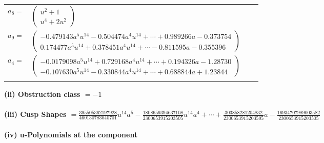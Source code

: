 \documentclass[1p]{elsarticle_modified}
\theoremstyle{definition}
\begin{document}
\begin{tabular}{m{7pt} m{180pt} m{7pt} m{180pt} }
\flushright $a_{8}=$&$\begin{pmatrix}u^2+1\\u^4+2 u^2\end{pmatrix}$ \\
\flushright $a_{9}=$&$\begin{pmatrix}-0.479143 a^{5} u^{14}-0.504474 a^{4} u^{14}+\cdots+0.989266 a-0.373754\\0.174477 a^{5} u^{14}+0.378451 a^{4} u^{14}+\cdots-0.811595 a-0.355396\end{pmatrix}$ \\
\flushright $a_{4}=$&$\begin{pmatrix}-0.0179098 a^{5} u^{14}+0.729168 a^{4} u^{14}+\cdots+0.194326 a-1.28730\\-0.107630 a^{5} u^{14}-0.330844 a^{4} u^{14}+\cdots+0.688844 a+1.23844\end{pmatrix}$\\&\end{tabular}
\flushleft \textbf{(ii) Obstruction class $= -1$}\\~\\
\flushleft \textbf{(iii) Cusp Shapes $= \frac{395505362197928}{460130783040701} u^{14} a^5-\frac{1808659394637108}{2300653915203505} u^{14} a^4+\cdots+\frac{303858281204832}{2300653915203505} a-\frac{16934707989003582}{2300653915203505}$}\\~\\
\newpage\renewcommand{\arraystretch}{1}
\flushleft \textbf{(iv) u-Polynomials at the component}\newline \\
\end{document}
